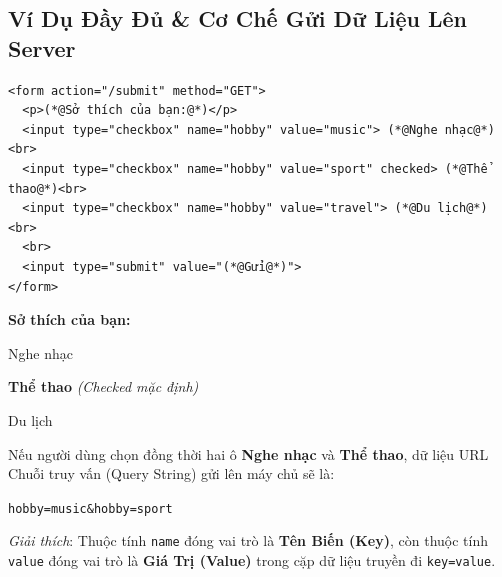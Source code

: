 \documentclass[11pt,oneside]{book}
\newcommand{\codeinline}[1]{\textcolor{accentOrange}{\texttt{#1}}}
\begin{document}
\subsection{Ví Dụ Đầy Đủ \& Cơ Chế Gửi Dữ Liệu Lên Server}

\begin{codeWindow}
\begin{lstlisting}[language=HTML5]
<form action="/submit" method="GET">
  <p>(*@Sở thích của bạn:@*)</p>
  <input type="checkbox" name="hobby" value="music"> (*@Nghe nhạc@*)<br>
  <input type="checkbox" name="hobby" value="sport" checked> (*@Thể thao@*)<br>
  <input type="checkbox" name="hobby" value="travel"> (*@Du lịch@*)<br>
  <br>
  <input type="submit" value="(*@Gửi@*)">
</form>
\end{lstlisting}
\end{codeWindow}

\begin{browserWindow}
\sffamily\small
\textbf{Sở thích của bạn:} \\[5pt]
 \; Nghe nhạc \\[4pt]
 \; \textbf{Thể thao} \quad \textcolor{codeComment}{\small\textit{(Checked mặc định)}} \\[4pt]
 \; Du lịch \\[8pt]
\end{browserWindow}

\begin{tipBox}
Nếu người dùng chọn đồng thời hai ô \textbf{Nghe nhạc} và \textbf{Thể thao}, dữ liệu URL Chuỗi truy vấn (Query String) gửi lên máy chủ sẽ là:
\begin{center}
\codeinline{hobby=music\&hobby=sport}
\end{center}
\textit{Giải thích}: Thuộc tính \codeinline{name} đóng vai trò là \textbf{Tên Biến (Key)}, còn thuộc tính \codeinline{value} đóng vai trò là \textbf{Giá Trị (Value)} trong cặp dữ liệu truyền đi \codeinline{key=value}.
\end{tipBox}
\end{document}
